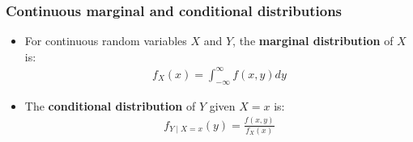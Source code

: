 \documentclass[handout]{beamer}\usepackage[]{graphicx}\usepackage[]{color}
\numberwithin{equation}{section}
\begin{document}
\begin{frame}
\frametitle{Continuous marginal and conditional distributions}
\begin{itemize}
\pause \item For continuous random variables $X$ and $Y$, the {\bf marginal distribution} of $X$ is:
\pause \begin{align*}
f_X(x) = \int_{-\infty}^\infty f(x,y) dy
\end{align*}
\pause \item The {\bf conditional distribution} of $Y$ given $X = x$ is:
\pause \begin{align*}
f_{Y \mid X = x}(y) = \frac{f(x,y)}{f_X(x)}
\end{align*}
\end{itemize}
\end{frame}
\end{document}
